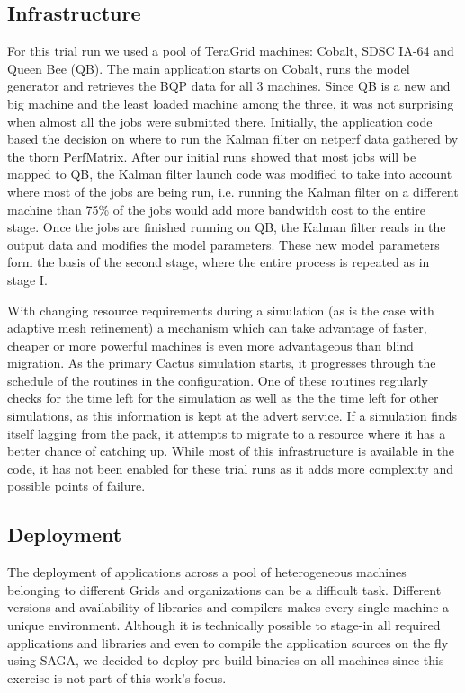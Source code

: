 \documentclass[conference,final]{IEEEtran}
\begin{document}
\subsection{Infrastructure}
For this trial run we used a pool of TeraGrid machines: Cobalt, SDSC
IA-64 and Queen Bee (QB). The main application starts on Cobalt, runs the
model generator and retrieves the BQP data for all 3 machines.  Since
QB is a new and big machine and the least loaded machine among
the three, it was not surprising when almost all the jobs were
submitted there.  Initially, the application code based the decision
on where to run the Kalman filter on netperf data gathered by the
thorn PerfMatrix. After our initial runs showed that most jobs will be
mapped to QB, the Kalman filter launch code was modified to
take into account where most of the jobs are being run, i.e. running
the Kalman filter on a different machine than 75\% of the jobs would
add more bandwidth cost to the entire stage. Once the jobs are
finished running on QB, the Kalman filter reads in the output
data and modifies the model parameters. These new model parameters
form the basis of the second stage, where the entire process is
repeated as in stage I.

With changing resource requirements during a simulation (as is the
case with adaptive mesh refinement) a mechanism which can take
advantage of faster, cheaper or more powerful machines is even more
advantageous than blind migration. As the primary Cactus simulation
starts, it progresses through the schedule of the routines in the
configuration. One of these routines regularly checks for the time
left for the simulation as well as the the time left for other
simulations, as this information is kept at the advert service. If a
simulation finds itself lagging from the pack, it attempts to migrate
to a resource where it has a better chance of catching up. While most
of this infrastructure is available in the code, it has not been
enabled for these trial runs as it adds more complexity and possible
points of failure.


\subsection{Deployment}
The deployment of applications across a pool of heterogeneous machines
belonging to different Grids and organizations can be a difficult
task. Different versions and availability of libraries and compilers
makes every single machine a unique environment. Although it is
technically possible to stage-in all required applications and
libraries and even to compile the application sources on the fly using
SAGA, we decided to deploy pre-build binaries on all machines since
this exercise is not part of this work's focus.
\end{document}
